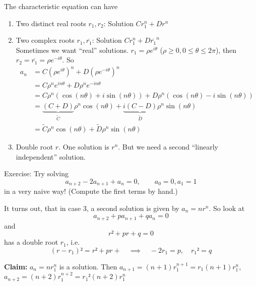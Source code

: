 \documentclass[english]{lbscript}
\begin{document}
The characteristic equation can have
\begin{enumerate}[label=\arabic{*})]
\item\label{item:18} Two distinct real roots \(r_1, r_2\): Solution \(C r_1^{n}+Dr^{n}\)
\item\label{item:19} Two complex roots \(r_1, \overline{r_1}\): Solution \(C r_1^{n} + D \overline{r_1}^{n}\)\\
  Sometimes we want \enquote{real} solutions. \(r_1=𝜌e^{i𝜃}\) (\(𝜌≥0, 0≤𝜃≤2𝜋\)), then \(r_2= \overline{r_1}= 𝜌 e^{-i𝜃}\).
So
\begin{align}
\label{eq:72}
  a_n
  &= C\left(𝜌 e^{i𝜃} \right)^{n}+D\left(𝜌 e^{-i𝜃} \right)^{n}\\
  &= C 𝜌^{n} e^{in𝜃}+D𝜌^{n}e^{-in𝜃}\\
  &= C 𝜌^{n} \left(\cos(n𝜃)+i\sin(n𝜃) \right)  + D𝜌^{n}\left(\cos(n𝜃)-i\sin(n𝜃) \right) \\
  &= \underbrace{(C+D)}_{\tilde{C}} 𝜌^{n} \cos(n𝜃) + \underbrace{i(C-D)}_{\tilde{D}} 𝜌^{n} \sin(n𝜃) \\
  &= \tilde{C} 𝜌^{n} \cos(n𝜃)+\tilde{D} 𝜌^{n} \sin(n𝜃)
\end{align}

\item\label{item:20} Double root \(r\). One solution is \(r^{n}\). But we need a second \enquote{linearly independent} solution.
\end{enumerate}

\begin{example}{}{}
Exercise: Try solving
\begin{equation}
\label{eq:73}
a_{n+2}-2a_{n+1} + a_{n} = 0, \quad \quad a_0=0, a_1=1
\end{equation}
in a very naive way! (Compute the first terms by hand.)
\end{example}

It turns out, that in case 3, a second solution is given by \(a_n=n r^{n}\). So look at
\begin{equation}
\label{eq:74}
a_{n+2} + p a_{n+1} + q a_n = 0
\end{equation}
and
\begin{equation}
\label{eq:75}
r²+pr+q=0
\end{equation}
has a double root \(r_1\), i.e.
\begin{equation}
\label{eq:76}
(r-r_1)² = r²+pr+\quad ⟹\quad -2r_1=p, \quad r_1²=q
\end{equation}

\textbf{Claim:} \(a_n=n r_1^{n}\) is a solution. Then \(a_{n+1}=(n+1)r_1^{n+1}= r_1 (n+1)r_1^{n}\), \(a_{n+2}=(n+2)r_1^{n+2}= r_1²(n+2)r_1^{n}\)
\end{document}

